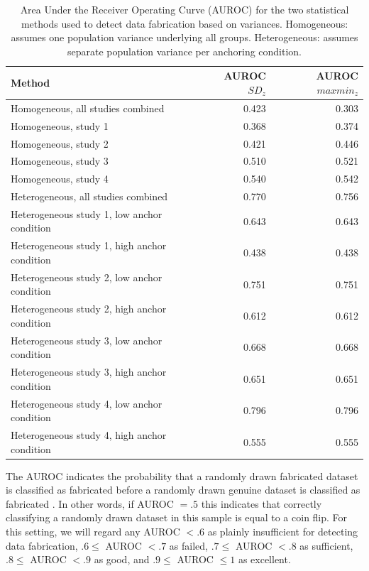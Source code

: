 \documentclass{article}
\begin{document}
\begin{table}[ht]
\centering
\begin{tabular}{lrr}
  \hline
Method & AUROC $SD_z$ & AUROC $maxmin_z$ \\ 
  \hline
Homogeneous, all studies combined & 0.423 & 0.303 \\ 
  Homogeneous, study 1 & 0.368 & 0.374 \\ 
  Homogeneous, study 2 & 0.421 & 0.446 \\ 
  Homogeneous, study 3 & 0.510 & 0.521 \\ 
  Homogeneous, study 4 & 0.540 & 0.542 \\ 
  Heterogeneous, all studies combined & 0.770 & 0.756 \\ 
  Heterogeneous study 1, low anchor condition & 0.643 & 0.643 \\ 
  Heterogeneous study 1, high anchor condition & 0.438 & 0.438 \\ 
  Heterogeneous study 2, low anchor condition & 0.751 & 0.751 \\ 
  Heterogeneous study 2, high anchor condition & 0.612 & 0.612 \\ 
  Heterogeneous study 3, low anchor condition & 0.668 & 0.668 \\ 
  Heterogeneous study 3, high anchor condition & 0.651 & 0.651 \\ 
  Heterogeneous study 4, low anchor condition & 0.796 & 0.796 \\ 
  Heterogeneous study 4, high anchor condition & 0.555 & 0.555 \\ 
   \hline
\end{tabular}
\caption{Area Under the Receiver Operating Curve (AUROC) for the two statistical methods used to detect data fabrication based on variances. Homogeneous: assumes one population variance underlying all groups. Heterogeneous: assumes separate population variance per anchoring condition.} 
\label{auroc_variances}
\end{table}
The AUROC indicates the probability that a randomly drawn fabricated dataset is classified as fabricated before a randomly drawn genuine dataset is classified as fabricated \citep{doi:10.1148/radiology.143.1.7063747}. In other words, if AUROC $=.5$ this indicates that correctly classifying a randomly drawn dataset in this sample is equal to a coin flip. For this setting, we will regard any AUROC $<.6$ as plainly insufficient for detecting data fabrication, $.6\leq$ AUROC $<.7$ as failed, $.7\leq$ AUROC $<.8$ as sufficient, $.8\leq$ AUROC $<.9$ as good, and $.9\leq$ AUROC $\leq 1$ as excellent.
\end{document}
